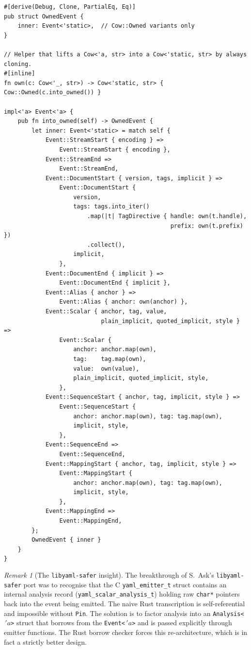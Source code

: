 \documentclass[12pt]{article}
\theoremstyle{definition}
\theoremstyle{remark}
\newtheorem{remark}[theorem]{Remark}
\newcommand{\lifetime}[1]{\ensuremath{\,'\!#1}}
\begin{document}
\begin{lstlisting}
#[derive(Debug, Clone, PartialEq, Eq)]
pub struct OwnedEvent {
    inner: Event<'static>,  // Cow::Owned variants only
}

// Helper that lifts a Cow<'a, str> into a Cow<'static, str> by always cloning.
#[inline]
fn own(c: Cow<'_, str>) -> Cow<'static, str> { Cow::Owned(c.into_owned()) }

impl<'a> Event<'a> {
    pub fn into_owned(self) -> OwnedEvent {
        let inner: Event<'static> = match self {
            Event::StreamStart { encoding } =>
                Event::StreamStart { encoding },
            Event::StreamEnd =>
                Event::StreamEnd,
            Event::DocumentStart { version, tags, implicit } =>
                Event::DocumentStart {
                    version,
                    tags: tags.into_iter()
                        .map(|t| TagDirective { handle: own(t.handle),
                                                prefix: own(t.prefix) })
                        .collect(),
                    implicit,
                },
            Event::DocumentEnd { implicit } =>
                Event::DocumentEnd { implicit },
            Event::Alias { anchor } =>
                Event::Alias { anchor: own(anchor) },
            Event::Scalar { anchor, tag, value,
                            plain_implicit, quoted_implicit, style } =>
                Event::Scalar {
                    anchor: anchor.map(own),
                    tag:    tag.map(own),
                    value:  own(value),
                    plain_implicit, quoted_implicit, style,
                },
            Event::SequenceStart { anchor, tag, implicit, style } =>
                Event::SequenceStart {
                    anchor: anchor.map(own), tag: tag.map(own),
                    implicit, style,
                },
            Event::SequenceEnd =>
                Event::SequenceEnd,
            Event::MappingStart { anchor, tag, implicit, style } =>
                Event::MappingStart {
                    anchor: anchor.map(own), tag: tag.map(own),
                    implicit, style,
                },
            Event::MappingEnd =>
                Event::MappingEnd,
        };
        OwnedEvent { inner }
    }
}
\end{lstlisting}

\begin{remark}[The \texttt{libyaml-safer} insight]
\label{rem:libyaml-safer}
The breakthrough of S.~Ask's \texttt{libyaml-safer} port was to recognise
that the C \texttt{yaml\_emitter\_t} struct contains an internal
analysis record (\texttt{yaml\_scalar\_analysis\_t}) holding raw
\texttt{char*} pointers back into the event being emitted. The naive
Rust transcription is self-referential and impossible without
\texttt{Pin}. The solution is to factor analysis into an
\texttt{Analysis<\lifetime{a}>} struct that borrows from the
\texttt{Event<\lifetime{a}>} and is passed explicitly through emitter
functions. The Rust borrow checker forces this re-architecture, which
is in fact a strictly better design.
\end{remark}
\end{document}
